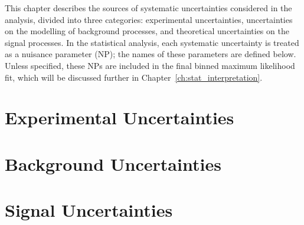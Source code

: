 \label{ch:SystsUncer}

This chapter describes the sources of systematic uncertainties considered in the analysis, divided into three categories: experimental uncertainties, uncertainties on the modelling of background processes, and theoretical uncertainties on the signal processes. In the statistical analysis, each systematic uncertainty is treated as a nuisance parameter (NP); the names of these parameters are defined below. 
Unless specified, these NPs are included in the final binned maximum likelihood fit, which will be discussed further in Chapter~\ref{ch:stat_interpretation}.

%
\section{Experimental Uncertainties}

%
\clearpage
\section{Background Uncertainties}

%
\clearpage
\section{Signal Uncertainties}


